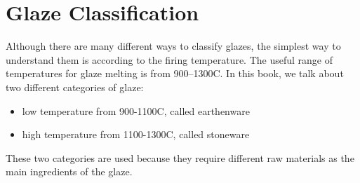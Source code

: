 \section{Glaze Classification}
Although there are many different ways to classify glazes, the simplest way to 
understand them is according to the firing temperature. The useful range of 
temperatures for glaze melting is from 900\degree --1300\degree C. In this 
book, we talk about two different categories of glaze:
\begin{itemize}
\item low temperature from 900-1100\degree C, called earthenware
\item high temperature from 1100-1300\degree C, called stoneware
\end{itemize} 
These two categories are used because they require different raw materials as 
the main ingredients of the glaze.
